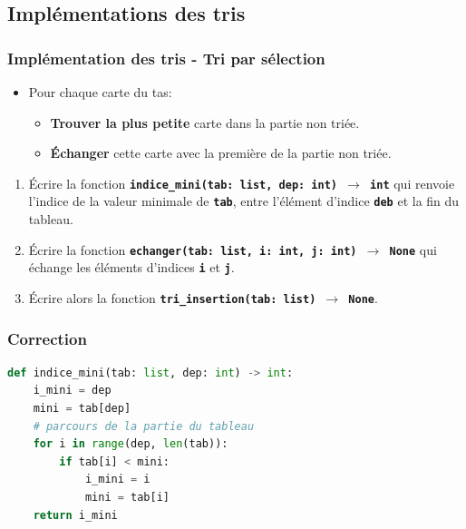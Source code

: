 \documentclass[svgnames,11pt]{beamer}
\begin{document}
\subsection{Implémentations des tris}
\begin{frame}
    \frametitle{Implémentation des tris - Tri par sélection}

    \begin{itemize}
        \item Pour chaque carte du tas:
              \begin{itemize}
                  \item \textbf{Trouver la plus petite} carte dans la partie non triée.
                  \item \textbf{Échanger} cette carte avec la première de la partie non triée.
              \end{itemize}

    \end{itemize}

    \begin{activite}
        \begin{enumerate}
            \item Écrire la fonction \textbf{\texttt{indice\_mini(tab: list, dep: int) $\rightarrow$ int}} qui renvoie l'indice de la valeur minimale de \textbf{\texttt{tab}}, entre l'élément d'indice \textbf{\texttt{deb}} et la fin du tableau.
            \item Écrire la fonction \textbf{\texttt{echanger(tab: list, i: int, j: int) $\rightarrow$ None}} qui échange les éléments d'indices \textbf{\texttt{i}} et \textbf{\texttt{j}}.
            \item Écrire alors la fonction \textbf{\texttt{tri\_insertion(tab: list) $\rightarrow$ None}}.
        \end{enumerate}
    \end{activite}

\end{frame}
\begin{frame}[fragile]
    \frametitle{Correction}

    \begin{center}
        \begin{lstlisting}[language=Python , basicstyle=\ttfamily\small, xleftmargin=2em, xrightmargin=0em]
def indice_mini(tab: list, dep: int) -> int:
    i_mini = dep
    mini = tab[dep]
    # parcours de la partie du tableau
    for i in range(dep, len(tab)):
        if tab[i] < mini:
            i_mini = i
            mini = tab[i]
    return i_mini
\end{lstlisting}
    \end{center}

\end{frame}
\end{document}
